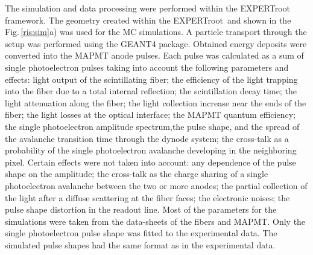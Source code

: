 \documentclass{webofc}
\newcommand{\er}{\textmd{EXPERTroot}}
\begin{document}
The simulation and data processing were performed within the \er\, framework.
The geometry created within the \er\ and shown in the Fig.\,\ref{ris:sim}a) was used for the MC simulations.
A particle transport through the setup was performed using the GEANT4 \cite{geant4} package.
Obtained energy deposits were converted into the MAPMT anode pulses.
Each pulse was calculated as a sum of single photoelectron pulses taking into account the following parameters and effects: light output of the scintillating fiber; the efficiency of the light trapping into the fiber due to a total internal reflection; the scintillation decay time; the light attenuation along the fiber; the light collection increase near the ends of the fiber; the light losses at the optical interface; the MAPMT quantum efficiency; the single photoelectron amplitude spectrum,the  pulse shape, and the spread of the avalanche transition time through the dynode system; the cross-talk as a probability of the single photoelectron avalanche developing in the neighboring pixel.
Certain effects were not taken into account: any dependence of the pulse shape on the amplitude; the cross-talk as the charge sharing of a single photoelectron avalanche between the two or more anodes; the partial collection of the light after a diffuse scattering at the fiber faces; the electronic noises; the pulse shape distortion in the readout line. Most of the parameters for the simulations were taken from the data-sheets of the fibers and MAPMT. Only the single photoelectron pulse shape was fitted to the experimental data. The simulated pulse shapes had the same format as in the experimental data.
\end{document}
